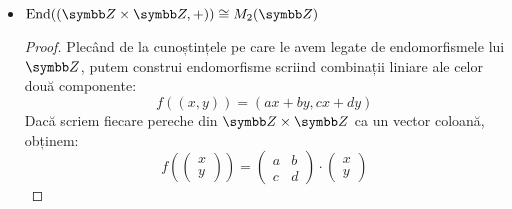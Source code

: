 \begin{exercise}[3.9]
\begin{itemize}
    \item \(\End((\integers \times \integers, +)) \cong M_2(\integers)\)
    \begin{proof}
    Plecând de la cunoștințele pe care le avem legate de endomorfismele lui \(\integers\), putem construi endomorfisme scriind combinații liniare ale celor două componente:
    \[
        f((x, y)) = (a x + b y, c x + d y)
    \]
    Dacă scriem fiecare pereche din \(\integers \times \integers\) ca un vector coloană, obținem:
    \[
        f(
        \begin{pmatrix}
            x \\
            y
        \end{pmatrix}
        ) = \begin{pmatrix}
            a & b \\
            c & d
        \end{pmatrix} 
        \cdot
        \begin{pmatrix}
            x \\
            y
        \end{pmatrix}
    \]
    \end{proof}
    
    \begin{comment}
    \item Pe de altă parte, \(\End((\reals, +)) \not\cong \reals\)
    \end{comment}
\end{itemize}
\end{exercise}

